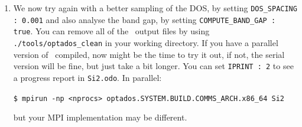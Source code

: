 \documentclass[a4paper,11pt,twoside]{book}
\begin{document}
{\begin{enumerate}
\begin{figure}[h]
\begin{center}
\caption{Density of States of Silicon generated by adaptive broadening and a very coarse energy sampling of 0.1 eV.}
\label{fig:Si2_adaptive1}
\end{center}
\end{figure}

\item We now try again with a better sampling of the DOS, by setting \verb#DOS_SPACING : 0.001# and also analyse the band gap, by setting \verb#COMPUTE_BAND_GAP : true#.  You can remove all of the \optados\ output files by using \verb#./tools/optados_clean# in your working directory.  If you have a parallel version of \optados\ compiled, now might be the time to try it out, if not, the serial version will be fine, but just take a bit longer.  You can set \verb#IPRINT : 2# to see a progress report in  \verb#Si2.odo#.  In parallel:

\verb#$ mpirun -np <nprocs> optados.SYSTEM.BUILD.COMMS_ARCH.x86_64 Si2#

but your MPI implementation may be different.


\end{enumerate}}
\end{document}
